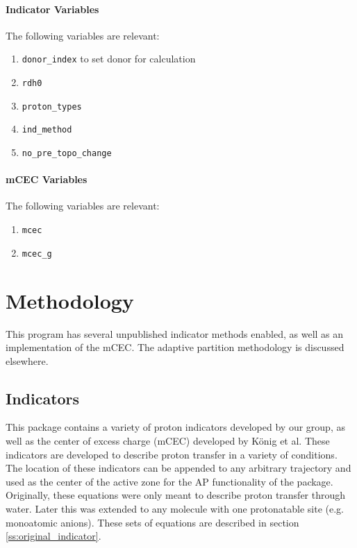 \documentclass{article}
\begin{document}
\paragraph{Indicator Variables}
The following variables are relevant:
\begin{enumerate}
	\item \texttt{donor\_index} to set donor for calculation
	\item \texttt{rdh0}
	\item \texttt{proton\_types}
	\item \texttt{ind\_method}
	\item \texttt{no\_pre\_topo\_change}
\end{enumerate}

\paragraph{mCEC Variables}
The following variables are relevant:
\begin{enumerate}
	\item \texttt{mcec}
	\item \texttt{mcec\_g}
\end{enumerate}

\section{Methodology}
This program has several unpublished indicator methods enabled, as well as an implementation of the mCEC.
The adaptive partition methodology is discussed elsewhere.

\subsection{Indicators}
This package contains a variety of proton indicators developed by our group,\cite{Wu2013,Pezeshki2015} as well as the center of excess charge (mCEC) developed by K\"onig et al.\cite{Konig2006}
These indicators are developed to describe proton transfer in a variety of conditions.
The location of these indicators can be appended to any arbitrary trajectory and used as the center of the active zone for the AP functionality of the package.
Originally, these equations were only meant to describe proton transfer through water.\cite{Wu2013,Pezeshki2015}
Later this was extended to any molecule with one protonatable site (e.g. monoatomic anions).\cite{Garza2019}
These sets of equations are described in section \ref{ss:original_indicator}.
\end{document}
